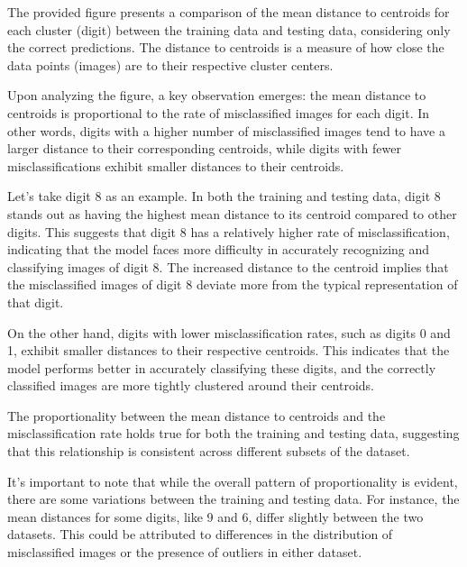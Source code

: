 
The provided figure presents a comparison of the mean distance to centroids for each cluster (digit) between the training data and testing data, considering only the correct predictions. The distance to centroids is a measure of how close the data points (images) are to their respective cluster centers.

Upon analyzing the figure, a key observation emerges: the mean distance to centroids is proportional to the rate of misclassified images for each digit. In other words, digits with a higher number of misclassified images tend to have a larger distance to their corresponding centroids, while digits with fewer misclassifications exhibit smaller distances to their centroids.

Let's take digit 8 as an example. In both the training and testing data, digit 8 stands out as having the highest mean distance to its centroid compared to other digits. This suggests that digit 8 has a relatively higher rate of misclassification, indicating that the model faces more difficulty in accurately recognizing and classifying images of digit 8. The increased distance to the centroid implies that the misclassified images of digit 8 deviate more from the typical representation of that digit.

On the other hand, digits with lower misclassification rates, such as digits 0 and 1, exhibit smaller distances to their respective centroids. This indicates that the model performs better in accurately classifying these digits, and the correctly classified images are more tightly clustered around their centroids.

The proportionality between the mean distance to centroids and the misclassification rate holds true for both the training and testing data, suggesting that this relationship is consistent across different subsets of the dataset.

It's important to note that while the overall pattern of proportionality is evident, there are some variations between the training and testing data. For instance, the mean distances for some digits, like 9 and 6, differ slightly between the two datasets. This could be attributed to differences in the distribution of misclassified images or the presence of outliers in either dataset.

